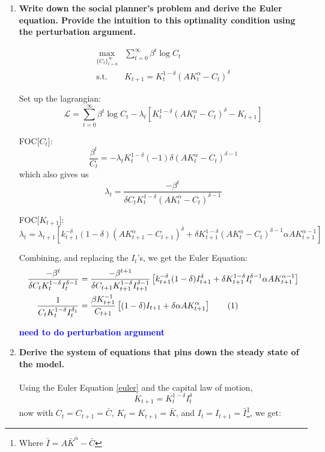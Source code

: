 \documentclass[]{article}
\newcommand{\sumti}{\sum\limits_{t=0}^\infty} %
\newcommand{\fix} [1] {\textbf{\textcolor{blue}{#1}}} %
\newcommand\numberthis{\addtocounter{equation}{1}\tag{\theequation}} %
\begin{document}
\begin{enumerate}

\item \textbf{Write down the social planner’s problem and derive the Euler equation. Provide the intuition to this optimality condition using the perturbation argument.} 

\begin{align*}
\max_{\{C_t\}_{t=0}^\infty} & \sumti \beta^t \log C_t 
\\
\text{s.t.}\; & K_{t+1}
 = K_t^{1-\delta}(AK_t^\alpha-C_t)^\delta
\end{align*}


Set up the lagrangian:
\[ \mathcal{L} = 
\sumti \beta^t \log C_t -\lambda_t 
[K_t^{1-\delta}(AK_t^\alpha -C_t)^\delta -K_{t+1} ]\]

FOC[$C_t$]:
\[\frac{\beta^t}{C_t} = -\lambda_t K_t^{1-\delta}(-1)\delta(AK_t^\alpha-C_t)^{\delta-1}
\]
which also gives us 
\[ \lambda_t = \frac{-\beta^t}{\delta C_t K_t^{1-\delta}(AK_t^\alpha-C_t)^{\delta-1}}\]

FOC[$K_{t+1}$]:
\[\lambda_t = \lambda_{t+1} [
k_{t+1}^{-\delta}(1-\delta)(AK_{t+1}^\alpha-C_{t+1})^\delta + 
\delta K_{t+1}^{1-\delta}(AK_t^\alpha -C_t)^{\delta-1}\alpha AK_{t+1}^{\alpha-1}]
\]


Combining, and replacing the $I_t$'s, we get the Euler Equation: 
\begin{align*}
\frac{-\beta^t}{\delta C_t K_t^{1-\delta}I_t^{\delta-1}} 
& = \frac{-\beta^{t+1}}{\delta C_{t+1} K_{t+1}^{1-\delta}I_{t+1}^{\delta-1}} 
\left[ k_{t+1}^{-\delta}(1-\delta)I_{t+1}^\delta + 
\delta K_{t+1}^{1-\delta}I_t^{\delta-1}\alpha AK_{t+1}^{\alpha-1}\right] 
\\
\frac{1}{C_tK_t^{1-\delta}I_t^{\delta_1}}
& = \frac{\beta K_{t+1}^{-1}}{C_{t+1}}
\left[ (1-\delta)I_{t+1}+\delta\alpha A K_{t+1}^\alpha \right]
\numberthis \label{euler}
\end{align*}

\fix{need to do perturbation argument} 


\item \textbf{Derive the system of equations that pins down the steady state of the model.}\\
\\
Using the Euler Equation \eqref{euler} and the capital law of motion, 
\begin{equation} \label{LOM}
K_{t+1}=K_{t}^{1-\delta}I_t^\delta 
\end{equation}
now with $C_t = C_{t+1} = \bar{C}$, $K_t=K_{t+1} = \bar{K}$, and $I_t = I_{t+1} = \bar{I}$\footnote{Where $\bar{I} = A\bar{K}^\alpha -\bar{C}$}, we get:


\end{enumerate}
\end{document}
